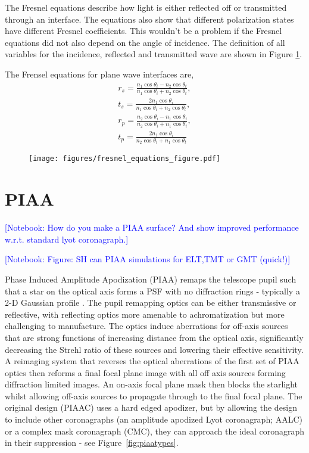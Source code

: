 \documentclass[letterpaper]{ar-1col}
\newcommand{\notebooksuggestion}[1]{\textcolor{blue}{[Notebook: #1]}}
\begin{document}
The Fresnel equations describe how light is either reflected off or transmitted through an interface. The equations also show that different polarization states have different Fresnel coefficients. This wouldn't be a problem if the Fresnel equations did not also depend on the angle of incidence. The definition of all variables for the incidence, reflected and transmitted wave are shown in Figure \ref{fig:fresnel_equations}.

The Frensel equations for plane wave interfaces are,
\begin{align}
r_s = \frac{n_1\cos{\theta_i} - n_2\cos{\theta_t}}{n_1\cos{\theta_i} + n_2\cos{\theta_t}},\\
t_s = \frac{2n_1 \cos{\theta_i}}{n_1\cos{\theta_i} + n_2\cos{\theta_t}},\\
r_p = \frac{n_2\cos{\theta_i} - n_1\cos{\theta_t}}{n_2\cos{\theta_i} + n_1\cos{\theta_t}},\\
t_p = \frac{2n_1 \cos{\theta_i}}{n_2\cos{\theta_i} + n_1\cos{\theta_t}}
\end{align}

\begin{figure}[ht]
  \centering
  \texttt{[image: figures/fresnel\_equations\_figure.pdf]}
  \caption{}
  \label{fig:fresnel_equations}
\end{figure}

\section{PIAA}\label{sec:piaa}

\notebooksuggestion{How do you make a PIAA surface? And show improved performance w.r.t. standard lyot coronagraph.}

\notebooksuggestion{Figure: SH can PIAA simulations for ELT,TMT or GMT (quick!)}

Phase Induced Amplitude Apodization (PIAA) remaps the telescope pupil such that a star on the optical axis forms a PSF with no diffraction rings - typically a 2-D Gaussian profile \citep{Guyon03,Guyon05,Guyon14}.
%
The pupil remapping optics can be either transmissive or reflective, with reflecting optics more amenable to achromatization but more challenging to manufacture.
%
The optics induce aberrations for off-axis sources that are strong functions of increasing distance from the optical axis, significantly decreasing the Strehl ratio of these sources and lowering their effective sensitivity.
%
A reimaging system that reverses the optical aberrations of the first set of PIAA optics then reforms a final focal plane image with all off axis sources forming diffraction limited images.
%
An on-axis focal plane mask then blocks the starlight whilst allowing off-axis sources to propagate through to the final focal plane.
%
The original design (PIAAC) uses a hard edged apodizer, but by allowing the design to include other coronagraphs (an amplitude apodized Lyot coronagraph; AALC) or a complex mask coronagraph (CMC), they can approach the ideal coronagraph in their suppression - see Figure~\ref{fig:piaatypes}.
\end{document}
